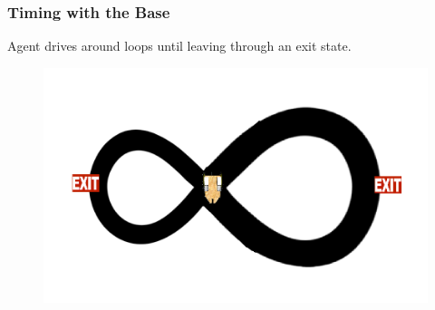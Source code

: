 \documentclass{beamer}
\begin{document}
\begin{frame}
\frametitle{Timing with the Base}
Agent drives around loops until leaving through an exit state. 

\begin{figure}
\includegraphics[width=0.8\linewidth]{lucasplots/monImages/doubleLoopImage.png}
\end{figure}
\end{frame}

\end{document}
